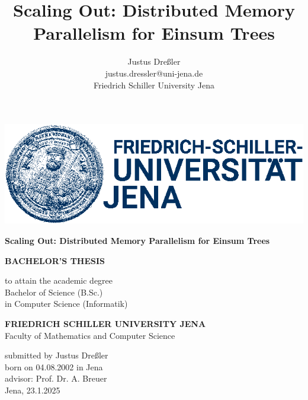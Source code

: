 \documentclass[a4paper, 12pt]{article}
\title{Scaling Out: Distributed Memory Parallelism for Einsum Trees}
\author{Justus Dreßler \\ justus.dressler@uni-jena.de \\ Friedrich Schiller University Jena}
\begin{document}
\thispagestyle{empty} 


\begin{titlepage}
    \begin{center}
        \includegraphics*[]{logo}
    \end{center}

    \vspace{40pt}

    \begin{center}
        \huge
        \textbf{Scaling Out: Distributed Memory Parallelism for Einsum Trees}
    \end{center}
    
    \vspace{20pt}

    \begin{center}
        \Large
        \textbf{BACHELOR'S THESIS}
    \end{center}


    \begin{center}
        \Large
        to attain the academic degree \\
        Bachelor of Science (B.Sc.) \\
        in Computer Science (Informatik)
    \end{center}

    \vspace{20pt}

    \begin{center}
        \large
        \textbf{FRIEDRICH SCHILLER UNIVERSITY JENA} \\
        Faculty of Mathematics and Computer Science \\
    \end{center}

    \vspace{20pt}

    \begin{center}
        \large
        submitted by Justus Dreßler \\
        born on 04.08.2002 in Jena \\
        advisor: Prof. Dr. A. Breuer \\
        Jena, 23.1.2025
    \end{center}
    
\end{titlepage}
\newpage
\end{document}

